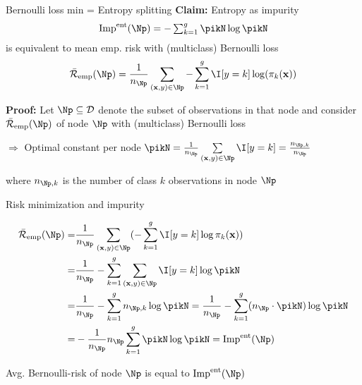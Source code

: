 \documentclass[11pt,compress,t,notes=noshow, xcolor=table]{beamer}
\begin{document}
\begin{frame}{Bernoulli loss min = Entropy splitting}
\textbf{Claim:} Entropy as impurity
$$\text{Imp}^{\text{ent}}(\Np) = -\textstyle\sum_{k = 1}^g \pikN \log \pikN$$
is equivalent to mean emp. risk with (multiclass) Bernoulli loss
$$\riskeb(\Np) = %
\frac{1}{n_\Np} \sum_{\xy \in \Np} -\sum_{k = 1}^g \I [y=k] \log (\pi_k(\xv))$$  %


\textbf{Proof:} %
Let $\Np \subseteq \D$ denote the subset of observations in that node and consider $\riskeb(\Np)$ of node $\Np$ with (multiclass) Bernoulli loss  

\vfill

$\Rightarrow$ Optimal constant per node $\pikN = \frac{1}{n_{\Np}} \sum\limits_{(\xv,y) \in \Np} \I [y=k] = \frac{n_{\Np,k}}{n_{\Np }}$\\

\vfill

where $n_{\Np,k}$ is the number of class $k$ observations in node $\Np$ \\


\end{frame}


\begin{frame2}[small]{Risk minimization and impurity}

\begin{align*}
\riskeb(\Np) =& \frac{1}{n_{\Np}} \sum_{\xy \in \Np} (- \sum_{k = 1}^g \I [y=k] \log \pi_k(\xv) ) \\
=& \frac{1}{n_{\Np}} -\sum_{k = 1}^g \sum_{\xy \in \Np} \I [y=k]\log \pikN \\
=& \frac{1}{n_{\Np}} -\sum_{k = 1}^g n_{\Np,k} \log \pikN =\frac{1}{n_{\Np}} -\sum_{k = 1}^g (n_\Np \cdot \pikN) \log \pikN  %
\\
=& - \frac{1}{n_{\Np}} n_{\Np} \sum_{k = 1}^g \pikN \log \pikN = \text{Imp}^{\text{ent}}(\Np)
\end{align*} 

Avg. Bernoulli-risk of node $\Np$ is equal to $\text{Imp}^{\text{ent}}(\Np)$

\end{frame2}
\end{document}
